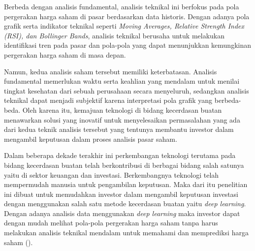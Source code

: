 Berbeda dengan analisis fundamental, analisis teknikal ini berfokus pada pola pergerakan harga saham di pasar berdasarkan data historis. Dengan adanya pola grafik serta indikator teknikal seperti \textit{Moving Averages, Relative Strength Index (RSI), dan Bollinger Bands}, analisis teknikal berusaha untuk melakukan identifikasi tren pada pasar dan pola-pola yang dapat menunjukkan kemungkinan pergerakan harga saham di masa depan.

Namun, kedua analisis saham tersebut memiliki keterbatasan. Analisis fundamental memerlukan waktu serta keahlian yang mendalam untuk menilai tingkat kesehatan dari sebuah perusahaan secara menyeluruh, sedangkan analisis teknikal dapat menjadi subjektif karena interpretasi pola grafik yang berbeda-beda. Oleh karena itu, kemajuan teknologi di bidang kecerdasan buatan menawarkan solusi yang inovatif untuk menyelesaikan permasalahan yang ada dari kedua teknik analisis tersebut yang tentunya membantu investor dalam mengambil keputusan dalam proses analisis pasar saham.

Dalam beberapa dekade terakhir ini perkembangan teknologi terutama pada bidang kecerdasan buatan telah berkontribusi di berbagai bidang salah satunya yaitu di sektor keuangan dan investasi. Berkembangnya teknologi telah mempermudah manusia untuk pengambilan keputusan. Maka dari itu penelitian ini dibuat untuk memudahkan investor dalam mengambil keputusan investasi dengan menggunakan salah satu metode kecerdasan buatan yaitu \textit{deep learning}. Dengan adanya analisis data menggunakan \textit{deep learning} maka investor dapat dengan mudah melihat pola-pola pergerakan harga saham tanpa harus melakukan analisis teknikal mendalam untuk memahami dan memprediksi harga saham (\cite{chairurrachman2022penerapan}).

